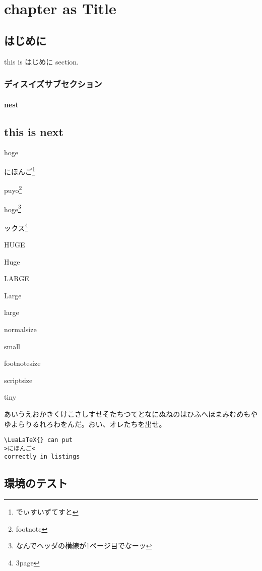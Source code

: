 \documentclass{word-lua}
\author{WORD太郎}
\subtitle{subtitleだぴょんhoge}
\begin{document}
\chapter{chapter as Title}

\section{はじめに}
this is はじめに section.

\subsection{ディスイズサブセクション}

\subsubsection{nest}

\section{this is next}

hoge

にほんご\footnote{でぃすいずてすと}

puyo\footnote{footnote}

hoge\footnote{なんでヘッダの横線が1ページ目でなーッ}

ックス\footnote{3page}

{\HUGE HUGE}

{\Huge Huge}

{\LARGE LARGE}

{\Large Large}

{\large large}

{\normalsize normalsize}

{\small small}

{\footnotesize footnotesize}

{\scriptsize scriptsize}

{\tiny tiny}

あいうえおかきくけこさしすせそたちつてとなにぬねのはひふへほまみむめもやゆよらりるれろわをんだ。おい、オレたちを出せ。

\lstset{language=TeX,numbers=left}
\begin{lstlisting}
\LuaLaTeX{} can put
>にほんご<
correctly in listings
\end{lstlisting}

% 

\section{環境のテスト}
\end{document}
